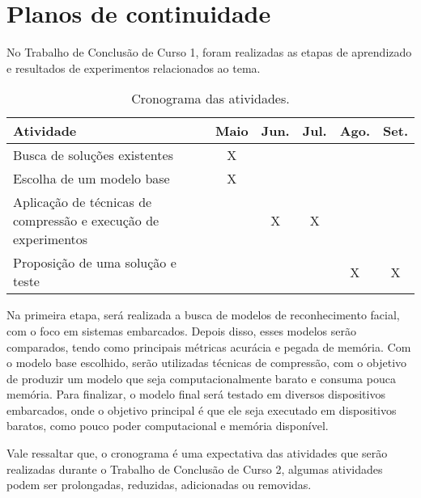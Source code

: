 \chapter{Planos de continuidade}
No Trabalho de Conclusão de Curso 1, foram realizadas as etapas de aprendizado e resultados de experimentos
relacionados ao tema.

\begin{center}
\begin{table}[htb]
\centering
\ABNTEXfontereduzida
\caption[Cronograma das atividades]{Cronograma das atividades.}
\label{tabela_acuracia_1}
\begin{tabular}{ |l|c|c|c|c|c| }
	\hline
	Atividade & Maio & Jun. & Jul. & Ago. & Set. \\
	\hline
	Busca de soluções existentes & X & & & & \\
	\hline
	Escolha de um modelo base & X & &  & & \\
	\hline
	Aplicação de técnicas de compressão e execução de experimentos & & X & X & & \\
	\hline
	Proposição de uma solução e teste & & & & X & X \\
	\hline
\end{tabular}
\end{table}
\end{center}

Na primeira etapa, será realizada a busca de modelos de reconhecimento facial, com o foco em sistemas embarcados.
Depois disso, esses modelos serão comparados, tendo como principais métricas acurácia e pegada de memória.
Com o modelo base escolhido, serão utilizadas técnicas de compressão, com o objetivo de produzir um modelo que seja
computacionalmente barato e consuma pouca memória.
Para finalizar, o modelo final será testado em diversos dispositivos embarcados, onde o objetivo principal é que ele
seja executado em dispositivos baratos, como pouco poder computacional e memória disponível.

Vale ressaltar que, o cronograma é uma expectativa das atividades que serão realizadas durante o Trabalho de Conclusão
de Curso 2, algumas atividades podem ser prolongadas, reduzidas, adicionadas ou removidas.
